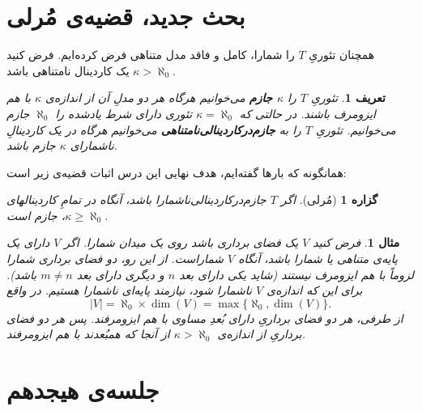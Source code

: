 \documentclass[12pt,a4paper]{report}
\theoremstyle{colorhead}
\newtheorem{mesal}[thm]{مثال}
\newtheorem{prop}[thm]{گزاره}
\newtheorem{defn}[thm]{تعریف}
\begin{document}
\section*{بحث جدید، قضیه‌ی مُرلی}
همچنان تئوریِ
$T$
را شمارا، کامل و فاقد مدل متناهی فرض کرده‌ایم. فرض کنید
$\kappa>\aleph_0$
یک کاردینال نامتناهی باشد.
\begin{defn}
تئوریِ
$T$
را 
\textbf{$\kappa$
جازم 
}
می‌خوانیم هرگاه هر دو مدلِ آن از اندازه‌ی
$\kappa$
با هم ایزومرف باشند. در حالتی که
$\kappa=\aleph_0$
تئوری دارای شرط یادشده را 
$\aleph_0$
جازم می‌خوانیم.
تئوریِ
$T$
را به
\textbf{ جازم‌درکاردینالی‌نامتناهی}
 می‌خوانیم هرگاه 
در یک کاردینالِ
ناشمارای
$\kappa$
جازم باشد. 
\end{defn}
همانگونه که بارها گفته‌ایم، هدف نهایی این درس اثبات قضیه‌ی زیر است:
\begin{prop}[مُرلی]
اگر
$T$
جازم‌در‌کاردینالی‌ناشمارا باشد،
آنگاه در تمامِ 
کاردینالهای
$\kappa\geq \aleph_0$،
جازم است.
\end{prop}
\begin{mesal}
فرض کنید
$V$
یک فضای برداری باشد روی یک میدان شمارا.
اگر
$V$
دارای یک پایه‌ی متناهی یا شمارا باشد، آنگاه
$V$
شماراست.
از این رو، دو فضای برداری شمارا لزوماً با هم ایزومرف نیستند (شاید یکی دارای بعد 
$n$
و دیگری دارای بعد
$m\not=n$
باشد).
 برای این که اندازه‌ی
$V$
ناشمارا شود، نیازمند پایه‌ای ناشمارا هستیم. در واقع
\[
|V|=\aleph_0\times \dim(V)=\max\{\aleph_0,\dim(V)\}.
\]
از طرفی، هر دو فضای برداریِ دارای بُعدِ مساوی با هم ایزومرفند. پس هر دو فضای برداریِ از اندازه‌ی
$\kappa>\aleph_0$
از آنجا  که همبُعدند با هم ایزومرفند.
\end{mesal}
\newpage
\section{جلسه‌ی هیجدهم}
\end{document}
